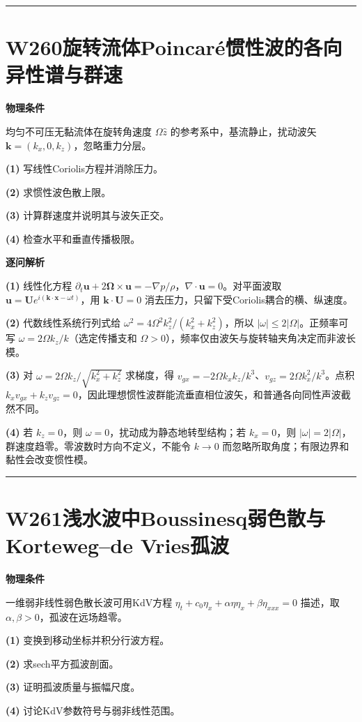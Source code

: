 \documentclass[UTF8,a4paper,11pt,oneside,openany]{ctexbook}
\begin{document}
\par\bigskip\hrule\bigskip
\section*{W260\quad 旋转流体Poincaré惯性波的各向异性谱与群速}
\textbf{物理条件}\par 均匀不可压无黏流体在旋转角速度 \(\Omega\hat z\) 的参考系中，基流静止，扰动波矢 \(\boldsymbol k=(k_x,0,k_z)\)，忽略重力分层。
\par\noindent\textbf{(1)} 写线性Coriolis方程并消除压力。
\par\noindent\textbf{(2)} 求惯性波色散上限。
\par\noindent\textbf{(3)} 计算群速度并说明其与波矢正交。
\par\noindent\textbf{(4)} 检查水平和垂直传播极限。

\par\medskip\noindent\textbf{逐问解析}
\par\noindent\textbf{(1)} 线性化方程 \(\partial_t\boldsymbol u+2\boldsymbol\Omega\times\boldsymbol u=-\nabla p/\rho\)，\(\nabla\cdot\boldsymbol u=0\)。对平面波取 \(\boldsymbol u=\boldsymbol Ue^{i(\boldsymbol k\cdot\boldsymbol x-\omega t)}\)，用 \(\boldsymbol k\cdot\boldsymbol U=0\) 消去压力，只留下受Coriolis耦合的横、纵速度。
\par\noindent\textbf{(2)} 代数线性系统行列式给 \(\omega^2=4\Omega^2k_z^2/(k_x^2+k_z^2)\)，所以 \(|\omega|\le2|\Omega|\)。正频率可写 \(\omega=2\Omega k_z/k\)（选定传播支和 \(\Omega>0\)），频率仅由波矢与旋转轴夹角决定而非波长模。
\par\noindent\textbf{(3)} 对 \(\omega=2\Omega k_z/\sqrt{k_x^2+k_z^2}\) 求梯度，得 \(v_{gx}=-2\Omega k_xk_z/k^3\)、\(v_{gz}=2\Omega k_x^2/k^3\)。点积 \(k_xv_{gx}+k_zv_{gz}=0\)，因此理想惯性波群能流垂直相位波矢，和普通各向同性声波截然不同。
\par\noindent\textbf{(4)} 若 \(k_z=0\)，则 \(\omega=0\)，扰动成为静态地转型结构；若 \(k_x=0\)，则 \(|\omega|=2|\Omega|\)，群速度趋零。零波数时方向不定义，不能令 \(k\to0\) 而忽略所取角度；有限边界和黏性会改变惯性模。

\par\bigskip\hrule\bigskip
\section*{W261\quad 浅水波中Boussinesq弱色散与Korteweg–de Vries孤波}
\textbf{物理条件}\par 一维弱非线性弱色散长波可用KdV方程 \(\eta_t+c_0\eta_x+\alpha\eta\eta_x+\beta\eta_{xxx}=0\) 描述，取 \(\alpha,\beta>0\)，孤波在远场趋零。
\par\noindent\textbf{(1)} 变换到移动坐标并积分行波方程。
\par\noindent\textbf{(2)} 求sech平方孤波剖面。
\par\noindent\textbf{(3)} 证明孤波质量与振幅尺度。
\par\noindent\textbf{(4)} 讨论KdV参数符号与弱非线性范围。
\end{document}

